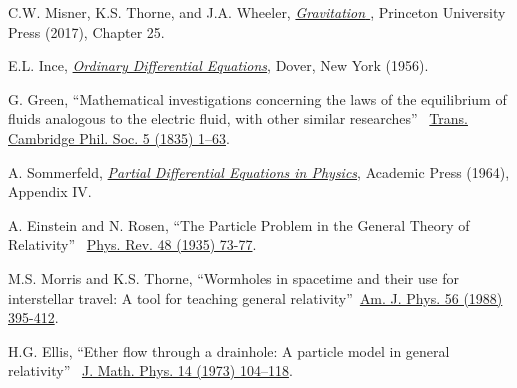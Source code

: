 \documentclass{article}%
\begin{document}
\newpage

\begin{thebibliography}{99}                                                                                               %


C.W. Misner, K.S. Thorne, and J.A. Wheeler,
\textit{\href{https://www.amazon.com/Gravitation-Charles-W-Misner/dp/0691177791/ref=sr_1_1?dchild=1&hvadid=78065396245556&hvbmt=bp&hvdev=c&hvqmt=p&keywords=misner+thorne+and+wheeler&qid=1609378280&sr=8-1&tag=mh0b-20}{\textit{Gravitation}%
}}, Princeton University Press (2017), Chapter 25.

E.L. Ince,
\textit{\href{https://www.google.com/books/edition/Ordinary_Differential_Equations/mbyqAAAAQBAJ?hl=en&gbpv=1&dq=E.L.+Ince,+Ordinary+Differential+Equations&printsec=frontcover}{\textit{Ordinary
Differential Equations}}}, Dover, New York (1956).

G. Green, \textquotedblleft Mathematical investigations
concerning the laws of the equilibrium of fluids analogous to the electric
fluid, with other similar researches\textquotedblright%
\ \href{https://babel.hathitrust.org/cgi/pt?id=nyp.33433004518365&view=1up&seq=13}{Trans.
Cambridge Phil. Soc. 5 (1835) 1--63}.

A. Sommerfeld,
\textit{\href{https://www.amazon.com/Partial-Differential-Equations-Lectures-Theoretical/dp/0126546584/ref=pd_sbs_14_5/144-0603225-6367369?_encoding=UTF8&pd_rd_i=0126546584&pd_rd_r=a17dd993-2c43-41cb-8229-41ae39f67895&pd_rd_w=HpjAM&pd_rd_wg=UwgN7&pf_rd_p=ed1e2146-ecfe-435e-b3b5-d79fa072fd58&pf_rd_r=2BD716DFW2V8N64XHVXE&psc=1&refRID=2BD716DFW2V8N64XHVXE}{\textit{Partial
Differential Equations in Physics}}}, Academic Press (1964), Appendix IV.

A. Einstein and N. Rosen, \textquotedblleft The Particle Problem
in the General Theory of Relativity\textquotedblright%
\ \href{https://doi.org/10.1103/PhysRev.48.73}{Phys. Rev. 48 (1935) 73-77}.

M.S. Morris and K.S. Thorne, \textquotedblleft Wormholes in
spacetime and their use for interstellar travel: A tool for teaching general
relativity\textquotedblright\ \href{https://doi.org/10.1119/1.15620}{Am. J.
Phys. 56 (1988) 395-412}.

H.G. Ellis, \textquotedblleft Ether flow through a drainhole:
A particle model in general relativity\textquotedblright%
\ \href{https://doi.org/10.1063/1.1666161}{J. Math. Phys. 14 (1973) 104--118}.


\end{thebibliography}
\end{document}
